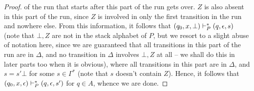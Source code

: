 \begin{soln}
\begin{proof}
        of the run that starts after this part of the run gets over.\nl
        $Z$ is also absent in this part of the run, since $Z$ is involved in only the first transition in the run and nowhere else.\nl 
        From this information, it follows that $(q_0, x, \bot) \vdash_P^* (q, \epsilon, s)$ (note that $\bot, Z$ are not in the stack alphabet of $P$, but we resort to a slight abuse of
        notation here, since we are guaranteed that all transitions in this part of the run are in $\Delta$, and no transition in $\Delta$ involves $\bot, Z$ at all -- we shall do this in later
        parts too when it is obvious), where all transitions in this part are in $\Delta$, and $s = s'\bot$ for some $s \in \Gamma^*$ (note that $s$ doesn't contain $Z$).\nl
        Hence, it follows that $(q_0, x, \epsilon) \vdash_P^* (q, \epsilon, s')$ for $q \in A$, whence we are done.
    \end{proof}

\end{soln}
